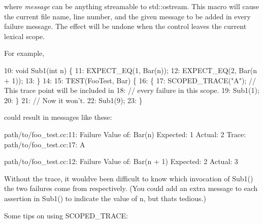 where {\itshape message} can be anything streamable to {\ttfamily std\+::ostream}. This macro will cause the current file name, line number, and the given message to be added in every failure message. The effect will be undone when the control leaves the current lexical scope.

For example,


\begin{DoxyCode}
10: void Sub1(int n) \{
11:   EXPECT\_EQ(1, Bar(n));
12:   EXPECT\_EQ(2, Bar(n + 1));
13: \}
14:
15: TEST(FooTest, Bar) \{
16:   \{
17:     SCOPED\_TRACE("A");  // This trace point will be included in
18:                         // every failure in this scope.
19:     Sub1(1);
20:   \}
21:   // Now it won't.
22:   Sub1(9);
23: \}
\end{DoxyCode}


could result in messages like these\+:


\begin{DoxyCode}
path/to/foo\_test.cc:11: Failure
Value of: Bar(n)
Expected: 1
  Actual: 2
   Trace:
path/to/foo\_test.cc:17: A

path/to/foo\_test.cc:12: Failure
Value of: Bar(n + 1)
Expected: 2
  Actual: 3
\end{DoxyCode}


Without the trace, it would\textquotesingle{}ve been difficult to know which invocation of {\ttfamily Sub1()} the two failures come from respectively. (You could add an extra message to each assertion in {\ttfamily Sub1()} to indicate the value of {\ttfamily n}, but that\textquotesingle{}s tedious.)

Some tips on using {\ttfamily S\+C\+O\+P\+E\+D\+\_\+\+T\+R\+A\+CE}\+:


